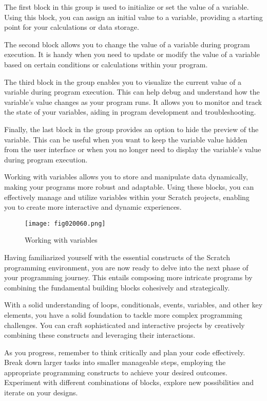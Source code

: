The first block in this group is used to initialize or set the value of a variable. Using this block, you can assign an initial value to a variable, providing a starting point for your calculations or data storage.

The second block allows you to change the value of a variable during program execution. It is handy when you need to update or modify the value of a variable based on certain conditions or calculations within your program.

The third block in the group enables you to visualize the current value of a variable during program execution. This can help debug and understand how the variable's value changes as your program runs. It allows you to monitor and track the state of your variables, aiding in program development and troubleshooting.

Finally, the last block in the group provides an option to hide the preview of the variable. This can be useful when you want to keep the variable value hidden from the user interface or when you no longer need to display the variable's value during program execution.

Working with variables allows you to store and manipulate data dynamically, making your programs more robust and adaptable. Using these blocks, you can effectively manage and utilize variables within your Scratch projects, enabling you to create more interactive and dynamic experiences.

\begin{figure}[H]
   \centering
   \texttt{[image: fig020060.png]}
   \caption{Working with variables}
\label{fig020060}
\end{figure}

Having familiarized yourself with the essential constructs of the Scratch programming environment, you are now ready to delve into the next phase of your programming journey. This entails composing more intricate programs by combining the fundamental building blocks cohesively and strategically.

With a solid understanding of loops, conditionals, events, variables, and other key elements, you have a solid foundation to tackle more complex programming challenges. You can craft sophisticated and interactive projects by creatively combining these constructs and leveraging their interactions.

As you progress, remember to think critically and plan your code effectively. Break down larger tasks into smaller manageable steps, employing the appropriate programming constructs to achieve your desired outcomes. Experiment with different combinations of blocks, explore new possibilities and iterate on your designs.

